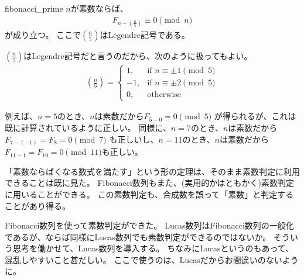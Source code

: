 \begin{Theo}{}{fibonacci_prime}
$n$が素数ならば、
\begin{align*}
F_{n - \left(\frac{n}{5}\right)} \equiv 0 \pmod{n}
\end{align*}
が成り立つ。
ここで$\left(\frac{n}{5}\right)$はLegendre記号である。
\end{Theo}

$\left(\frac{n}{5}\right)$はLegendre記号だと言うのだから、次のように扱ってもよい。
\begin{align*}
\left(\frac{n}{5}\right) =
\begin{cases}
1, &\mbox{if }n \equiv \pm 1 \pmod{5}\\
-1, &\mbox{if }n \equiv \pm 2 \pmod{5}\\
0, &\mbox{otherwise}
\end{cases}
\end{align*}

例えば、$n=5$のとき、$n$は素数だから$F_{5 - 0} = 0 \pmod{5}$
が得られるが、これは既に計算されているように正しい。
同様に、$n=7$のとき、$n$は素数だから
$F_{7 - (-1)} = F_{8} = 0 \pmod{7}$
も正しいし、$n=11$のとき、$n$は素数だから
$F_{11 - 1} = F_{10} = 0 \pmod{11}$も正しい。

「素数ならばくなる数式を満たす」という形の定理は、そのまま素数判定に利用できることは既に見た。
Fibonacci数列もまた、(実用的かはともかく)素数判定に用いることができる。
この素数判定も、合成数を誤って「素数」と判定することがあり得る。


Fibonacci数列を使って素数判定ができた。
Lucas数列はFibonacci数列の一般化であるが、ならば同様にLucas数列でも素数判定ができるのではないか。
そういう思考を働かせて、Lucas数列を導入する。
ちなみにLucasというのもあって、混乱しやすいこと甚だしい。
ここで使うのは、Lucasだからお間違いのないように。

